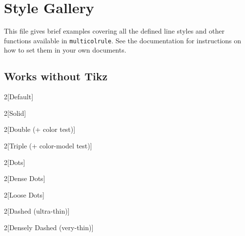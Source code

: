 \documentclass{article}
\begin{document}
\section*{Style Gallery}
This file gives brief examples covering all the defined line styles and
other functions available in \texttt{multicolrule}. See the documentation
for instructions on how to set them in your own documents.

\subsection*{Works without Tikz}
\begin{multicols}{2}[Default]
\lipsum[1]
\end{multicols}

\begin{multicols}{2}[Solid]
  \lipsum[1]
\end{multicols}

\begin{multicols}{2}[Double (+ color test)]
  \lipsum[1]
\end{multicols}

\begin{multicols}{2}[Triple (+ color-model test)]
  \lipsum[1]
\end{multicols}

\begin{multicols}{2}[Dots]
  \lipsum[1]
\end{multicols}

\begin{multicols}{2}[Dense Dots]
  \lipsum[1]
\end{multicols}

\begin{multicols}{2}[Loose Dots]
  \lipsum[1]
\end{multicols}

\begin{multicols}{2}[Dashed (ultra-thin)]
  \lipsum[1]
\end{multicols}

\begin{multicols}{2}[Densely Dashed (very-thin)]
  \lipsum[1]
\end{multicols}
\end{document}
